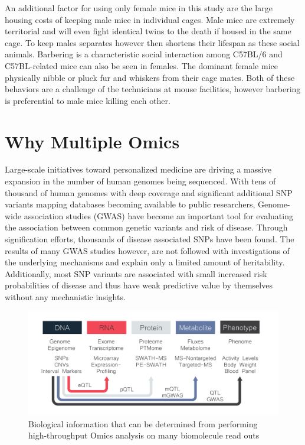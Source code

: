 \documentclass[a4paper]{book}
\begin{document}
	An additional factor for using only female mice in this study are the large housing costs of keeping male mice in individual cages. Male mice are extremely territorial and will even fight identical twins to the death if housed in the same cage. To keep males separates however then shortens their lifespan as these social animals. Barbering is a characteristic social interaction among C57BL/6 and C57BL-related mice can also be seen in females\citep{Kalueff2006HairResearch}. The dominant female mice physically nibble or pluck fur and whiskers from their cage mates\citep{Kalueff2006HairResearch}. Both of these behaviors are a challenge of the technicians at mouse facilities, however barbering is preferential to male mice killing each other.
		
	\section{Why Multiple Omics}
	
	Large-scale initiatives toward personalized medicine are driving a massive expansion in the number of human genomes being sequenced. With tens of thousand of human genomes with deep coverage \citep{Telenti2016Deepgenomes} and significant additional SNP variants mapping databases becoming available to public researchers, Genome-wide association studies (GWAS) have become an important tool for evaluating the association between common genetic variants and risk of disease. Through signification efforts, thousands of disease associated SNPs have been found\citep{Johnson2009AnResults.}. The results of many GWAS studies however, are not followed with investigations of the underlying mechanisms and explain only a limited amount of heritability. Additionally, most SNP variants are associated with small increased risk probabilities of disease and thus have weak predictive value by themselves without any mechanistic insights. 
	
	\begin{figure}
		\includegraphics[width=\textwidth]{1.Introduction_Figures/Multiomics.pdf}
		\caption{Biological information that can be determined from performing high-throughput Omics analysis on many biomolecule read outs}
		\label{fig:Multi_Omics Methods}
	\end{figure}
	
\end{document}
